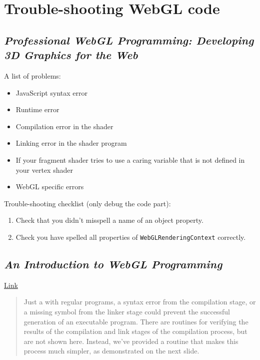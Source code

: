 \section{Trouble-shooting WebGL code}\label{trouble-shooting-webgl-code}

\subsection{\texorpdfstring{\emph{Professional WebGL Programming:
Developing 3D Graphics for the
Web}}{Professional WebGL Programming: Developing 3D Graphics for the Web}}\label{professional-webgl-programming-developing-3d-graphics-for-the-web}

A list of problems:

\begin{itemize}
\tightlist
\item
  JavaScript syntax error
\item
  Runtime error
\item
  Compilation error in the shader
\item
  Linking error in the shader program
\item
  If your fragment shader tries to use a caring variable that is not
  defined in your vertex shader
\item
  WebGL specific errors
\end{itemize}

Trouble-shooting checklist (only debug the code part):

\begin{enumerate}
\def\labelenumi{\arabic{enumi}.}
\tightlist
\item
  Check that you didn't misspell a name of an object property.
\item
  Check you have spelled all properties of
  \texttt{WebGLRenderingContext} correctly.
\end{enumerate}

\subsection{\texorpdfstring{\emph{An Introduction to WebGL
Programming}}{An Introduction to WebGL Programming}}\label{an-introduction-to-webgl-programming}

\href{https://www.cs.unm.edu/~angel/SIGGRAPH14/Introduction\%20to\%20WebGL\%20Programming.pdf}{Link}

\begin{quote}
Just a with regular programs, a syntax error from the compilation stage,
or a missing symbol from the linker stage could prevent the successful
generation of an executable program. There are routines for verifying
the results of the compilation and link stages of the compilation
process, but are not shown here. Instead, we've provided a routine that
makes this process much simpler, as demonstrated on the next slide.
\end{quote}

